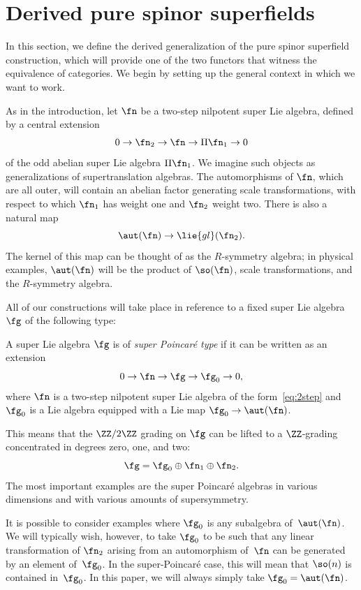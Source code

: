 \section{Derived pure spinor superfields}
In this section, we define the derived generalization of the pure spinor superfield construction, which will provide one of the two functors that witness the equivalence of categories. We begin by setting up the general context in which we want to work.

As in the introduction, let $\fn$ be a two-step nilpotent super Lie algebra, defined by a central extension
\begin{equation}\label{eq:2step}
	0 \to \fn_2 \to \fn \to \Pi \fn_1 \to 0
\end{equation}
of the odd abelian super Lie algebra $\Pi \fn_1$. We imagine such objects as generalizations of supertranslation algebras. The automorphisms of $\fn$, which are all outer, will contain an abelian factor generating scale transformations, with respect to which $\fn_1$ has weight one and $\fn_2$ weight two. There is also a natural map
\begin{equation*}
	\aut(\fn) \to \lie{gl}(\fn_2).
\end{equation*}
The kernel of this map can be thought of as the $R$-symmetry algebra; in physical examples, $\aut(\fn)$ will be the product of $\so(\fn)$, scale transformations, and the $R$-symmetry algebra.

All of our constructions will take place in reference to a fixed super Lie algebra $\fg$ of the following type:
\begin{dfn}
	A super Lie algebra $\fg$ is of \emph{super Poincar\'e type} if it can be written as an extension
	\begin{equation*}
	0 \to \fn \to \fg \to \fg_0 \to 0,
	\end{equation*}
	where $\fn$ is a two-step nilpotent super Lie algebra of the form~\eqref{eq:2step} and $\fg_0$ is a Lie algebra equipped with a Lie map $\fg_0 \to \aut(\fn)$.
\end{dfn}

This means that the $\ZZ/2\ZZ$ grading on $\fg$ can be lifted to a $\ZZ$-grading concentrated in degrees zero, one, and two:
\begin{equation*}
\fg = \fg_0 \oplus \fn_1 \oplus \fn_2.
\end{equation*}
The most important examples are the super Poincar\'e algebras in various dimensions and with various amounts of supersymmetry.

It is possible to consider examples where $\fg_0$ is any subalgebra of~$\aut(\fn)$. We will typically wish, however, to take $\fg_0$ to
be such that any linear transformation of $\fn_2$ arising from an automorphism of~$\fn$ can be generated by an element of~$\fg_0$.
In the super-Poincar\'e case, this will mean that $\so(n)$ is contained in~$\fg_0$. In this paper, we will always simply take $\fg_0 = \aut(\fn)$.

